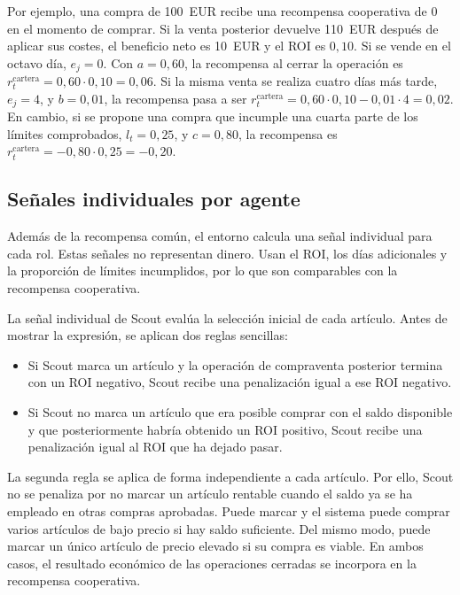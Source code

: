 Por ejemplo, una compra de 100~EUR recibe una recompensa cooperativa de $0$ en el momento de comprar. Si la venta posterior devuelve 110~EUR después de aplicar sus costes, el beneficio neto es 10~EUR y el ROI es $0{,}10$. Si se vende en el octavo día, $e_j=0$. Con $a=0{,}60$, la recompensa al cerrar la operación es $r_t^{\mathrm{cartera}}=0{,}60\cdot0{,}10=0{,}06$. Si la misma venta se realiza cuatro días más tarde, $e_j=4$, y $b=0{,}01$, la recompensa pasa a ser $r_t^{\mathrm{cartera}}=0{,}60\cdot0{,}10-0{,}01\cdot4=0{,}02$. En cambio, si se propone una compra que incumple una cuarta parte de los límites comprobados, $l_t=0{,}25$, y $c=0{,}80$, la recompensa es $r_t^{\mathrm{cartera}}=-0{,}80\cdot0{,}25=-0{,}20$.

\subsection{Señales individuales por agente}
\label{sec:senales-individuales-agentes}

Además de la recompensa común, el entorno calcula una señal individual para cada rol. Estas señales no representan dinero. Usan el ROI, los días adicionales y la proporción de límites incumplidos, por lo que son comparables con la recompensa cooperativa.

La señal individual de Scout evalúa la selección inicial de cada artículo. Antes de mostrar la expresión, se aplican dos reglas sencillas:

\begin{itemize}
    \item Si Scout marca un artículo y la operación de compraventa posterior termina con un ROI negativo, Scout recibe una penalización igual a ese ROI negativo.
    \item Si Scout no marca un artículo que era posible comprar con el saldo disponible y que posteriormente habría obtenido un ROI positivo, Scout recibe una penalización igual al ROI que ha dejado pasar.
\end{itemize}

La segunda regla se aplica de forma independiente a cada artículo. Por ello, Scout no se penaliza por no marcar un artículo rentable cuando el saldo ya se ha empleado en otras compras aprobadas. Puede marcar y el sistema puede comprar varios artículos de bajo precio si hay saldo suficiente. Del mismo modo, puede marcar un único artículo de precio elevado si su compra es viable. En ambos casos, el resultado económico de las operaciones cerradas se incorpora en la recompensa cooperativa.

